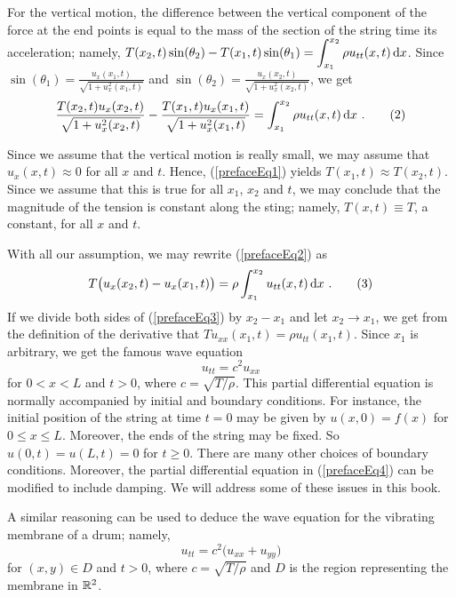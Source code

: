 For the vertical motion, the difference between
the vertical component of the force at the end points is equal to the
mass of the section of the string time its acceleration; namely,
$\displaystyle T(x_2,t) \sin(\theta_2) - T(x_1,t) \sin(\theta_1) =
\int_{x_1}^{x_2} \rho u_{tt}(x,t) \,\mathrm{d}{x}$.  Since
$\displaystyle \sin(\theta_1) = \frac{u_x(x_1,t)}{\sqrt{1+u_x^2(x_1,t)}}$ 
and
$\displaystyle \sin(\theta_2) = \frac{u_x(x_2,t)}{\sqrt{1+u_x^2(x_2,t)}}$,
we get
\begin{equation} \label{prefaceEq2}
\frac{T(x_2,t) u_x(x_2,t)}{\sqrt{1+u_x^2(x_2,t)}} -
\frac{T(x_1,t) u_x(x_1,t)}{\sqrt{1+u_x^2(x_1,t)}} = 
\int_{x_1}^{x_2} \rho u_{tt}(x,t) \,\mathrm{d}{x} \ . \tag{$2$}
\end{equation}

Since we assume that the vertical motion is really small, we may
assume that $u_x(x,t) \approx 0$ for all $x$ and $t$.  Hence, (\ref{prefaceEq1})
yields $T(x_1,t) \approx T(x_2,t)$.  Since we assume that this is true
for all $x_1$, $x_2$ and $t$, we may conclude that the magnitude of
the tension is constant along the sting; namely, $T(x,t) \equiv T$, a constant,
for all $x$ and $t$.

With all our assumption, we may rewrite (\ref{prefaceEq2}) as
\begin{equation} \label{prefaceEq3}
T \big( u_x(x_2,t) - u_x(x_1,t) \big) = \rho \int_{x_1}^{x_2}
u_{tt}(x,t) \,\mathrm{d}{x} \ .  \tag{$3$}
\end{equation}
If we divide both sides of (\ref{prefaceEq3}) by $x_2-x_1$ and let
$x_2 \to x_1$, we get from the definition of the derivative that
$T u_{xx}(x_1,t) = \rho u_{tt}(x_1,t)$.  Since $x_1$ is arbitrary, we
get the famous wave equation
\begin{equation} \label{prefaceEq4}
  u_{tt} = c^2 u_{xx} \tag{$4$}
\end{equation}
for $0 < x < L$ and $t > 0$, where $c = \sqrt{T/\rho}$.  This partial
differential equation is normally accompanied by initial and boundary
conditions.  For instance, the initial position of the string at time
$t=0$ may be given by $u(x,0) = f(x)$ for $0 \leq x \leq L$.
Moreover, the ends of the string may be fixed.  So $u(0,t) = u(L,t) = 0$
for $t\geq 0$.  There are many other choices of boundary conditions.
Moreover, the partial differential equation in (\ref{prefaceEq4}) can
be modified to include damping.  We will address some of these issues
in this book.

A similar reasoning can be used to deduce the wave equation for the
vibrating membrane of a drum; namely,
\[
u_{tt} = c^2 \big( u_{xx} + u_{yy} \big)
\]
for $(x,y) \in D$ and $t > 0$,  where $c = \sqrt{T/\rho}$ and $D$ is
the region representing the membrane in $\mathbb{R}^2$.

